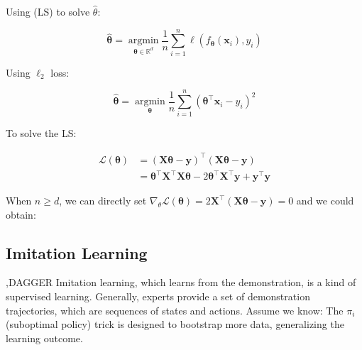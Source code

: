 \documentclass[10pt]{report}
\begin{document}
Using  (LS) to solve $\hat{\theta}$:

\[
    \widehat{\boldsymbol{\theta}}=\operatorname*{argmin}_{\boldsymbol{\theta}\in\mathbb{R}^d}\frac{1}{n}\sum_{i=1}^n\ell\left(f_{\boldsymbol{\theta}}(\boldsymbol{x}_i),y_i\right)
\]

Using $\ell_2$ loss:

\[
    \widehat{\boldsymbol{\theta}}=\operatorname*{argmin}_{\boldsymbol{\theta}}\frac1n\sum_{i=1}^n(\boldsymbol{\theta}^\top\boldsymbol{x}_i-y_i)^2
\]

To solve the LS:

\[
    \begin{aligned}
        \mathcal{L}(\boldsymbol\theta)& =(\boldsymbol{X\theta}-\boldsymbol{y})^\top(\boldsymbol{X\theta}-\boldsymbol{y}) \\
        &=\boldsymbol{\theta}^\top\boldsymbol{X}^\top\boldsymbol{X}\boldsymbol{\theta}-2\boldsymbol{\theta}^\top\boldsymbol{X}^\top\boldsymbol{y}+\boldsymbol{y}^\top\boldsymbol{y}
    \end{aligned}
\]

When $n\ge d$, we can directly set $\nabla_\theta\mathcal{L}(\boldsymbol{\theta})=2\boldsymbol{X}^\top(\boldsymbol{X}\boldsymbol{\theta}-\boldsymbol{y})=0$ and we could obtain:



\subsection{Imitation Learning}

\sep{DAGGER}
Imitation learning, which learns from the demonstration, is a kind of supervised learning. Generally, experts provide a set of demonstration trajectories, which are sequences of states
and actions. Assume we know:
The $\pi_i$ (suboptimal policy) trick is designed to bootstrap more data, generalizing the learning outcome.
\end{document}
